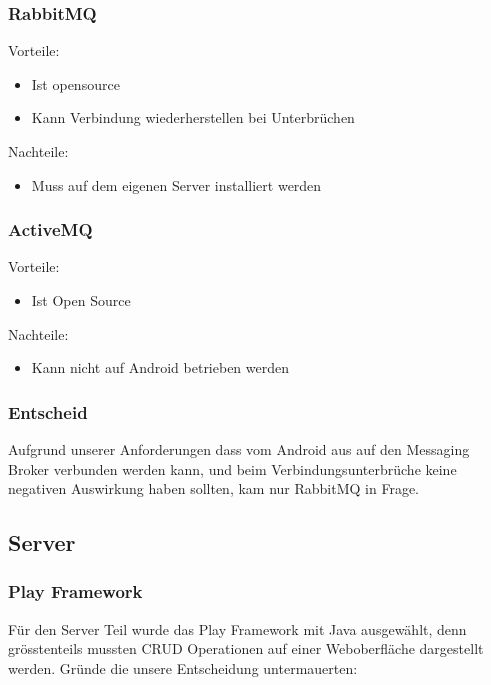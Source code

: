 \subsubsection{RabbitMQ}
Vorteile:
\begin{itemize}
	\item Ist opensource
	\item Kann Verbindung wiederherstellen bei Unterbrüchen
\end{itemize}

Nachteile:
\begin{itemize}
	\item Muss auf dem eigenen Server installiert werden
\end{itemize}

\subsubsection{ActiveMQ}
Vorteile:
\begin{itemize}
	\item Ist Open Source
\end{itemize}

Nachteile:
\begin{itemize}
	\item Kann nicht auf Android betrieben werden
\end{itemize}

\subsubsection{Entscheid}
Aufgrund unserer Anforderungen dass vom Android aus auf den Messaging Broker verbunden werden kann, und beim Verbindungsunterbrüche keine negativen Auswirkung haben sollten, kam nur RabbitMQ in Frage.

\subsection{Server}

\subsubsection{Play Framework}
Für den Server Teil wurde das Play Framework mit Java ausgewählt, denn grösstenteils mussten CRUD Operationen auf einer Weboberfläche dargestellt werden. Gründe die unsere Entscheidung untermauerten:


